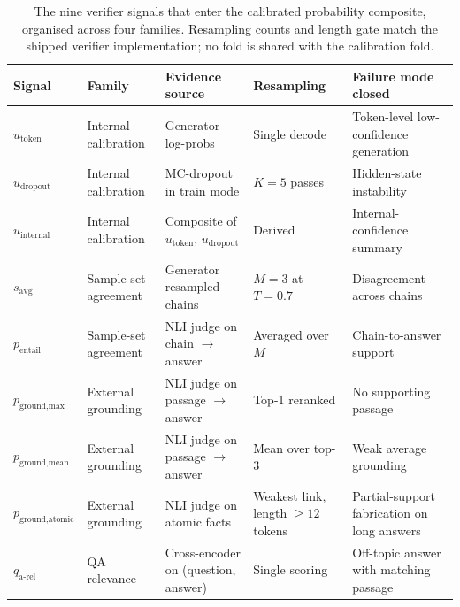 \begin{table}[!htbp]
\centering
\footnotesize
\begin{tabular}{@{}p{2.4cm}p{2.6cm}p{3.0cm}p{2.6cm}p{3.4cm}@{}}
\toprule
\textbf{Signal} & \textbf{Family} & \textbf{Evidence source} & \textbf{Resampling} & \textbf{Failure mode closed} \\
\midrule
$u_{\text{token}}$        & Internal calibration & Generator log-probs                    & Single decode          & Token-level low-confidence generation \\
$u_{\text{dropout}}$      & Internal calibration & MC-dropout in train mode               & $K{=}5$ passes         & Hidden-state instability \\
$u_{\text{internal}}$     & Internal calibration & Composite of $u_{\text{token}}$, $u_{\text{dropout}}$ & Derived         & Internal-confidence summary \\
$s_{\text{avg}}$          & Sample-set agreement & Generator resampled chains             & $M{=}3$ at $T{=}0.7$   & Disagreement across chains \\
$p_{\text{entail}}$       & Sample-set agreement & NLI judge on chain $\to$ answer        & Averaged over $M$      & Chain-to-answer support \\
$p_{\text{ground,max}}$   & External grounding   & NLI judge on passage $\to$ answer      & Top-1 reranked         & No supporting passage \\
$p_{\text{ground,mean}}$  & External grounding   & NLI judge on passage $\to$ answer      & Mean over top-3        & Weak average grounding \\
$p_{\text{ground,atomic}}$ & External grounding  & NLI judge on atomic facts              & Weakest link, length $\ge 12$ tokens & Partial-support fabrication on long answers \\
$q_{\text{a-rel}}$        & QA relevance         & Cross-encoder on (question, answer)    & Single scoring         & Off-topic answer with matching passage \\
\bottomrule
\end{tabular}
\caption[The nine verifier signals that enter the calibrated probability composite, organised across four families.]{The nine verifier signals that enter the calibrated probability composite, organised across four families. Resampling counts and length gate match the shipped verifier implementation; no fold is shared with the calibration fold.}
\label{tab:verifier-signals}
\end{table}


